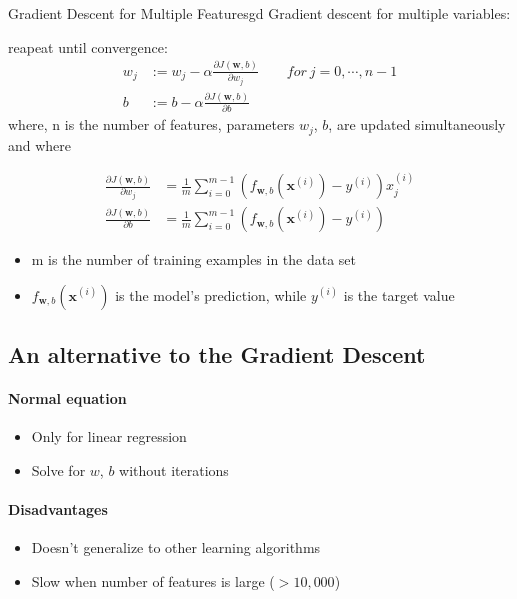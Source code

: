 \vspace{1em}
\begin{thmbox}{Gradient Descent for Multiple Features}{gd}
Gradient descent for multiple variables:

reapeat until convergence:
\begin{align}
    w_j &:= w_j - \alpha \frac{\partial J(\mathbf{w},b)}{\partial w_j} \ \ \ \ \ \ \ \ \ for\ j = 0, \cdots , n-1 \\
    b &:= b - \alpha \frac{\partial J(\mathbf{w},b)}{\partial b}
\end{align}
where, n is the number of features, parameters $w_j$,  $b$, are updated simultaneously and where  


\begin{align}
\frac{\partial J(\mathbf{w},b)}{\partial w_j}  &= \frac{1}{m} \sum\limits_{i = 0}^{m-1} (f_{\mathbf{w},b}(\mathbf{x}^{(i)}) - y^{(i)})x_{j}^{(i)} \tag{6}  \\
\frac{\partial J(\mathbf{w},b)}{\partial b}  &= \frac{1}{m} \sum\limits_{i = 0}^{m-1} (f_{\mathbf{w},b}(\mathbf{x}^{(i)}) - y^{(i)}) \tag{7}
\end{align}

\begin{notebox}
    \begin{itemize}
        \item m is the number of training examples in the data set
        \item $f_{\mathbf{w},b}(\mathbf{x}^{(i)})$ is the model's prediction, while $y^{(i)}$ is the target value
    \end{itemize}
\end{notebox}
\end{thmbox}

\subsection{An alternative to the Gradient Descent}
\paragraph*{Normal equation}
\begin{itemize}
    \item Only for linear regression
    \item Solve for $w$, $b$ without iterations
\end{itemize}

\paragraph*{Disadvantages}
\begin{itemize}
    \item Doesn't generalize to other learning algorithms
    \item Slow when number of features is large ($>10,000$)
\end{itemize}

